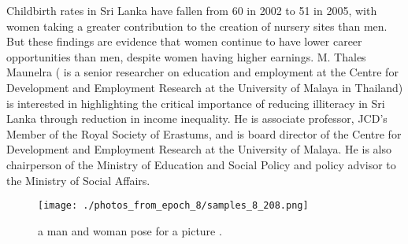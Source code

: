 \documentclass{article}%
\begin{document}
Childbirth rates in Sri Lanka have fallen from 60 in 2002 to 51 in 2005, with women taking a greater contribution to the creation of nursery sites than men. But these findings are evidence that women continue to have lower career opportunities than men, despite women having higher earnings.\newline%
M. Thales Maunelra ( is a senior researcher on education and employment at the Centre for Development and Employment Research at the University of Malaya in Thailand) is interested in highlighting the critical importance of reducing illiteracy in Sri Lanka through reduction in income inequality. He is associate professor, JCD's Member of the Royal Society of Erastums, and is board director of the Centre for Development and Employment Research at the University of Malaya. He is also chairperson of the Ministry of Education and Social Policy and policy advisor to the Ministry of Social Affairs.\newline%

%


\begin{figure}[h!]%
\centering%
\texttt{[image: ./photos\_from\_epoch\_8/samples\_8\_208.png]}%
\caption{a man and woman pose for a picture .}%
\end{figure}

%
\end{document}

